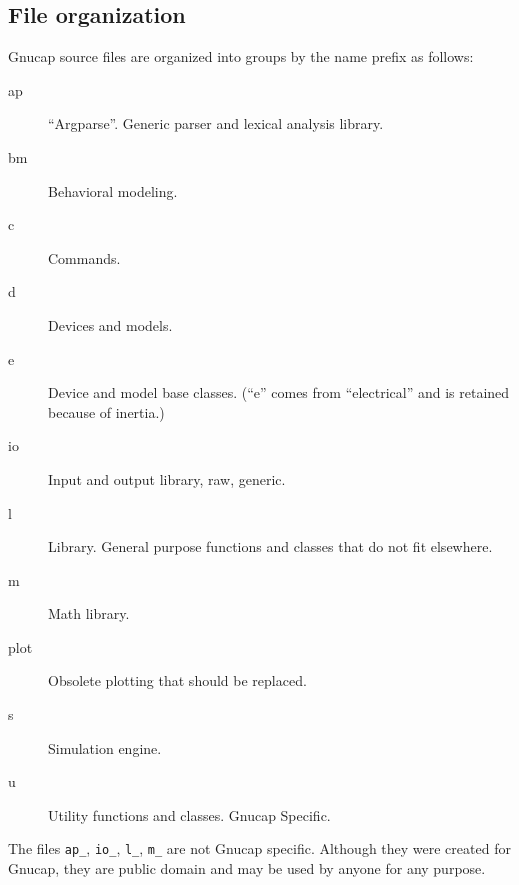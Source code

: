 %
%
%
%
\subsection{File organization}

Gnucap source files are organized into groups by the name prefix as follows:

\begin{description}
\item[ap] ``Argparse''.  Generic parser and lexical analysis library.
\item[bm] Behavioral modeling.
\item[c] Commands.
\item[d] Devices and models.
\item[e] Device and model base classes.  (``e'' comes from
  ``electrical'' and is retained because of inertia.)
\item[io] Input and output library, raw, generic.
\item[l] Library.  General purpose functions and classes that do not
  fit elsewhere.
\item[m] Math library.
\item[plot] Obsolete plotting that should be replaced.
\item[s] Simulation engine.
\item[u] Utility functions and classes.  Gnucap Specific.
\end{description}

The files {\tt ap\_\*}, {\tt io\_\*}, {\tt l\_\*}, {\tt m\_\*} are not Gnucap
specific.  Although they were created for Gnucap, they are public domain
and may be used by anyone for any purpose.

